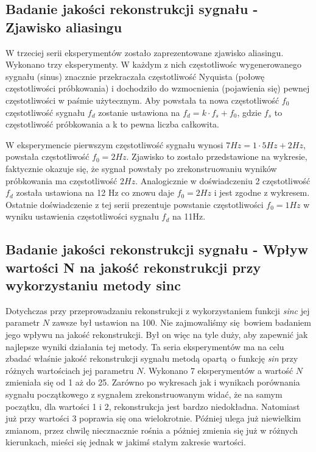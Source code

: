 \documentclass[12pt]{article}
\begin{document}
{{        }


        \subsection{Badanie jakości rekonstrukcji sygnału - Zjawisko aliasingu} {

        W trzeciej serii eksperymentów zostało zaprezentowane zjawisko aliasingu. Wykonano trzy
        eksperymenty. W każdym z nich częstotliwośc wygenerowanego sygnału (sinus) znacznie przekraczała
        częstotliwość Nyquista (połowę częstotliwości próbkowania) i dochodziło do wzmocnienia (pojawienia
        się) pewnej częstotliwości w paśmie użytecznym. Aby powstała ta nowa częstotliwość $f_0$
        częstotliwość sygnału $f_d$ zostanie ustawiona na $f_d = k \cdot f_s + f_0$, gdzie $f_s$ to
        częstotliwość próbkowania a k to pewna liczba całkowita.

        W eksperymencie pierwszym częstotliwość sygnału wynosi $7Hz = 1 \cdot 5Hz + 2Hz$, powstała
        częstotliwość $f_0 = 2Hz$. Zjawisko to zostało przedstawione na wykresie, faktycznie okazuje się, że
        sygnał powstały po zrekonstruowaniu wyników próbkowania ma częstotliwość $2Hz$. Analogicznie w
        doświadczeniu 2 częstotliwość $f_d$ została ustawiona na 12 Hz co znowu daje $f_0 = 2Hz$ i jest
        zgodne z wykresem. Ostatnie doświadczenie z tej serii prezentuje powstanie częstotliwości $f_0 =
        1Hz$ w wyniku ustawienia częstotliwości sygnału $f_d$ na 11Hz.

        }


        \subsection{Badanie jakości rekonstrukcji sygnału - Wpływ wartości N na jakość
        rekonstrukcji przy wykorzystaniu metody sinc} {

        Dotychczas przy przeprowadzaniu rekonstrukcji z wykorzystaniem funkcji \emph{sinc} jej parametr $N$
        zawsze był ustawion na 100. Nie zajmowaliśmy się bowiem badaniem jego wpływu na jakość
        rekonstrukcji. Był on więc na tyle duży, aby zapewnić jak najlepsze wyniki działania tej metody. Ta
        seria eksperymentów ma na celu zbadać właśnie jakość rekonstrukcji sygnału metodą opartą o funkcję
        \emph{sin} przy różnych wartościach jej parametru $N$. Wykonano 7 eksperymentów a wartość $N$
        zmieniała się od 1 aż do 25. Zarówno po wykresach jak i wynikach porównania sygnału początkowego z
        sygnałem zrekonstruowanym widać, że na samym początku, dla wartości 1 i 2, rekonstrukcja jest bardzo
        niedokładna. Natomiast już przy wartości 3 poprawia się ona wielokrotnie. Później ulega już
        niewielkim zmianom, przez chwilę niecznacznie rośnia a póżniej zmienia się już w różnych kierunkach,
        mieści się jednak w jakimś stałym zakresie wartości.

}}
\end{document}
